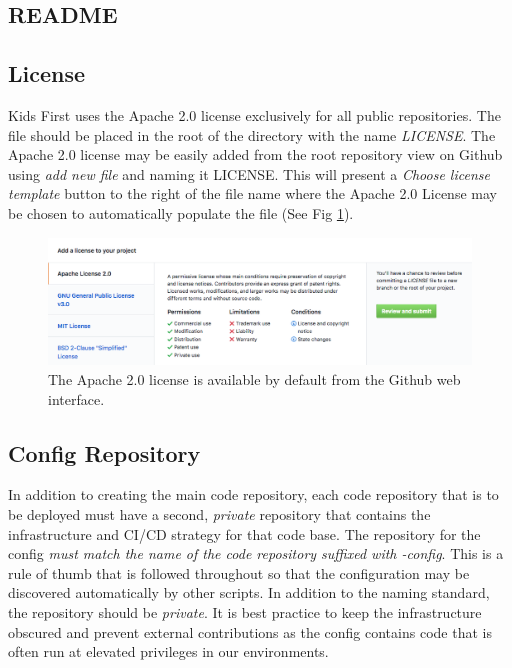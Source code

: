 \documentclass[a4paper,12pt,titlepage]{scrartcl}
\begin{document}
	\subsection{README}
	
	\subsection{License}
	
	Kids First uses the Apache 2.0 \cite{apache2} license exclusively for all public repositories.
	The file should be placed in the root of the directory with the name {\em LICENSE}.
	The Apache 2.0 license may be easily added from the root repository view on Github using {\em add new file} and naming it LICENSE.
	This will present a {\em Choose license template} button to the right of the file name where the Apache 2.0 License may be chosen to automatically populate the file (See Fig \ref{fig:addlicense}).
	
	\begin{figure}[t]
    		\centering
    		\includegraphics[width=0.8\linewidth]{images/license.png}
    		\caption{The Apache 2.0 license is available by default from the Github web interface.}
    		\label{fig:addlicense}
    \end{figure}
	
	\subsection{Config Repository}
	
	In addition to creating the main code repository, each code repository that is to be deployed must have a second, {\em private} repository that contains the infrastructure and CI/CD strategy for that code base.
	The repository for the config {\em must match the name of the code repository suffixed with -config}.
	This is a rule of thumb that is followed throughout so that the configuration may be discovered automatically by other scripts.
	In addition to the naming standard, the repository should be {\em private}.
	It is best practice to keep the infrastructure obscured and prevent external contributions as the config contains code that is often run at elevated privileges in our environments.
	
\end{document}
